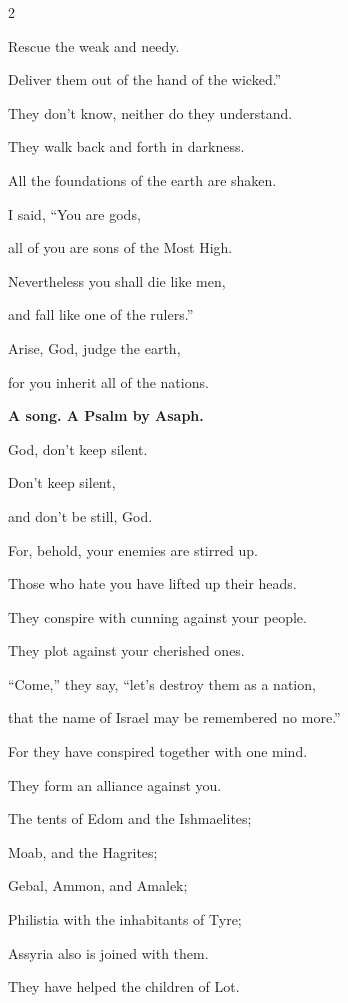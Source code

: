 \begin{multicols}{2}
	
	\myverse{}Rescue the weak and needy.
	
	Deliver them out of the hand of the wicked.”
	
	
	\myverse{}They don’t know, neither do they understand.
	
	They walk back and forth in darkness.
	
	All the foundations of the earth are shaken.
	
	
	\myverse{}I said, “You are gods,
	
	all of you are sons of the Most High.
	
	
	\myverse{}Nevertheless you shall die like men,
	
	and fall like one of the rulers.”
	
	
	\myverse{}Arise, God, judge the earth,
	
	for you inherit all of the nations.
	
	
	\mychapter{}\textbf{A song. A Psalm by Asaph.}
	
	\quad \myverse*{}God, don’t keep silent.
	
	Don’t keep silent,
	
	and don’t be still, God.
	
	
	\myverse{}For, behold, your enemies are stirred up.
	
	Those who hate you have lifted up their heads.
	
	
	\myverse{}They conspire with cunning against your people.
	
	They plot against your cherished ones.
	
	
	\myverse{}“Come,” they say, “let’s destroy them as a nation,
	
	that the name of Israel may be remembered no more.”
	
	
	\myverse{}For they have conspired together with one mind.
	
	They form an alliance against you.
	
	
	\myverse{}The tents of Edom and the Ishmaelites;
	
	Moab, and the Hagrites;
	
	
	\myverse{}Gebal, Ammon, and Amalek;
	
	Philistia with the inhabitants of Tyre;
	
	
	\myverse{}Assyria also is joined with them.
	
	They have helped the children of Lot.
	
	\vspace{\baselineskip}
	

\end{multicols}
